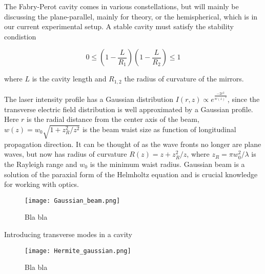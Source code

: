 The Fabry-Perot cavity comes in various constellations, but will mainly be discussing the plane-parallel, mainly for theory, or the hemispherical, which is in our current experimental setup. A stable cavity must satisfy the stability condistion

\begin{equation}
0 \leq \left(1 - \frac{L}{R_1}\right)\left(1 - \frac{L}{R_2}\right) \leq 1
\end{equation}

where $L$ is the cavity length and $R_{1,2}$ the radius of curvature of the mirrors.

The laser intensity profile has a Gaussian distribution $I(r, z) \propto e^{\frac{-2r^2}{w(z)^2}}$, since the transverse electric field distribution is well approximated by a Gaussian profile. Here $r$ is the radial distance from the center axis of the beam, $w(z) = w_0\sqrt{1 + z_R^2/z^2}$ is the beam waist size as function of longitudinal propagation direction. It can be thought of as the wave fronts no longer are plane waves, but now has radius of curvature $R(z) = z + z_R^2/z$, where $z_R = \pi w_0^2/\lambda$ is the Rayleigh range and $w_0$ is the minimum waist radius. Gaussian beam is a solution of the paraxial form of the Helmholtz equation and is crucial knowledge for working with optics.

\begin{figure}[H]
\centering
\texttt{[image: Gaussian\_beam.png]}
\caption{Bla bla}
\label{fig:gaussian_beam}
\end{figure}

Introducing transverse modes in a cavity

\begin{figure}[H]
\centering
\texttt{[image: Hermite\_gaussian.png]}
\caption{Bla bla}
\label{fig:hermite_modes}
\end{figure}